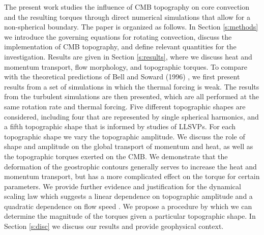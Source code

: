 

The present work studies the influence of CMB topography on core convection and the resulting torques through direct numerical simulations that allow for a non-spherical boundary. 
The paper is organized as follows. 
In Section \ref{s:methods} we introduce the governing equations for rotating convection, discuss the implementation of CMB topography, and define relevant quantities for the investigation.
Results are given in Section \ref{s:results}, where we discuss heat and momentum transport, flow morphology, and topographic torques. To compare with the theoretical predictions of Bell and Soward (1996) \citep{pB96}, we first present results from a set of simulations in which the thermal forcing is weak. 
The results from the turbulent simulations are then presented, which are all performed at the same rotation rate and thermal forcing.
Five different topographic shapes are considered, including four that are represented by single spherical harmonics, and a fifth topographic shape that is informed by studies of LLSVPs. 
For each topographic shape we vary the topographic amplitude.
We discuss the role of shape and amplitude on the global transport of momentum and heat, as well as the topographic torques exerted on the CMB. 
We demonstrate that the deformation of the geostrophic contours generally serves to increase the heat and momentum transport, but has a more complicated effect on the torque for certain parameters. 
We provide further evidence and justification for the dynamical scaling law which suggests a linear dependence on topographic amplitude and a quadratic dependence on flow speed \citep{tO25}.
We propose a procedure by which we can determine the magnitude of the torques given a particular topographic shape.
In Section \ref{s:disc} we discuss our results and provide geophysical context. 
